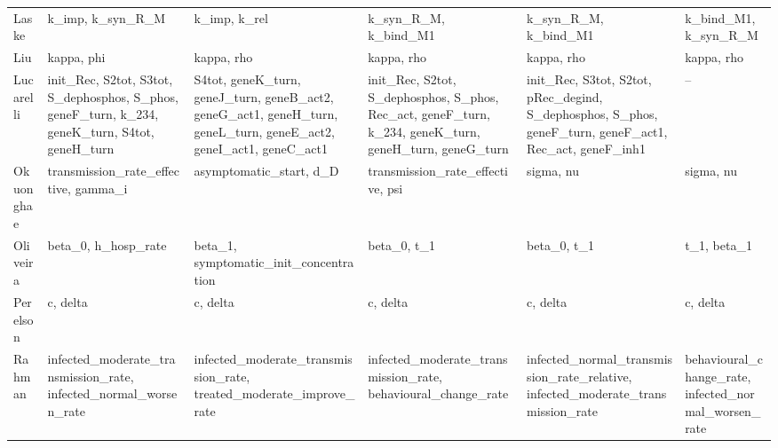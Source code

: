 \begin{longtable}{@{}l>{\raggedright}p{2.6cm}>{\raggedright}p{2.6cm}>{\raggedright}p{2.6cm}>{\raggedright}p{2.6cm}>{\raggedright\arraybackslash}p{2.6cm}@{}}
Laske & k\_\allowbreak{}imp, k\_\allowbreak{}syn\_\allowbreak{}R\_\allowbreak{}M & k\_\allowbreak{}imp, k\_\allowbreak{}rel & k\_\allowbreak{}syn\_\allowbreak{}R\_\allowbreak{}M, k\_\allowbreak{}bind\_\allowbreak{}M1 & k\_\allowbreak{}syn\_\allowbreak{}R\_\allowbreak{}M, k\_\allowbreak{}bind\_\allowbreak{}M1 & k\_\allowbreak{}bind\_\allowbreak{}M1, k\_\allowbreak{}syn\_\allowbreak{}R\_\allowbreak{}M \\
Liu & kappa, phi & kappa, rho & kappa, rho & kappa, rho & kappa, rho \\
Lucarelli & init\_\allowbreak{}Rec, S2tot, S3tot, S\_\allowbreak{}dephosphos, S\_\allowbreak{}phos, geneF\_\allowbreak{}turn, k\_\allowbreak{}234, geneK\_\allowbreak{}turn, S4tot, geneH\_\allowbreak{}turn & S4tot, geneK\_\allowbreak{}turn, geneJ\_\allowbreak{}turn, geneB\_\allowbreak{}act2, geneG\_\allowbreak{}act1, geneH\_\allowbreak{}turn, geneL\_\allowbreak{}turn, geneE\_\allowbreak{}act2, geneI\_\allowbreak{}act1, geneC\_\allowbreak{}act1 & init\_\allowbreak{}Rec, S2tot, S\_\allowbreak{}dephosphos, S\_\allowbreak{}phos, Rec\_\allowbreak{}act, geneF\_\allowbreak{}turn, k\_\allowbreak{}234, geneK\_\allowbreak{}turn, geneH\_\allowbreak{}turn, geneG\_\allowbreak{}turn & init\_\allowbreak{}Rec, S3tot, S2tot, pRec\_\allowbreak{}degind, S\_\allowbreak{}dephosphos, S\_\allowbreak{}phos, geneF\_\allowbreak{}turn, geneF\_\allowbreak{}act1, Rec\_\allowbreak{}act, geneF\_\allowbreak{}inh1 & -- \\
Okuonghae & transmission\_\allowbreak{}rate\_\allowbreak{}effective, gamma\_\allowbreak{}i & asymptomatic\_\allowbreak{}start, d\_\allowbreak{}D & transmission\_\allowbreak{}rate\_\allowbreak{}effective, psi & sigma, nu & sigma, nu \\
Oliveira & beta\_\allowbreak{}0, h\_\allowbreak{}hosp\_\allowbreak{}rate & beta\_\allowbreak{}1, symptomatic\_\allowbreak{}init\_\allowbreak{}concentration & beta\_\allowbreak{}0, t\_\allowbreak{}1 & beta\_\allowbreak{}0, t\_\allowbreak{}1 & t\_\allowbreak{}1, beta\_\allowbreak{}1 \\
Perelson & c, delta & c, delta & c, delta & c, delta & c, delta \\
Rahman & infected\_\allowbreak{}moderate\_\allowbreak{}transmission\_\allowbreak{}rate, infected\_\allowbreak{}normal\_\allowbreak{}worsen\_\allowbreak{}rate & infected\_\allowbreak{}moderate\_\allowbreak{}transmission\_\allowbreak{}rate, treated\_\allowbreak{}moderate\_\allowbreak{}improve\_\allowbreak{}rate & infected\_\allowbreak{}moderate\_\allowbreak{}transmission\_\allowbreak{}rate, behavioural\_\allowbreak{}change\_\allowbreak{}rate & infected\_\allowbreak{}normal\_\allowbreak{}transmission\_\allowbreak{}rate\_\allowbreak{}relative, infected\_\allowbreak{}moderate\_\allowbreak{}transmission\_\allowbreak{}rate & behavioural\_\allowbreak{}change\_\allowbreak{}rate, infected\_\allowbreak{}normal\_\allowbreak{}worsen\_\allowbreak{}rate \\

\end{longtable}
